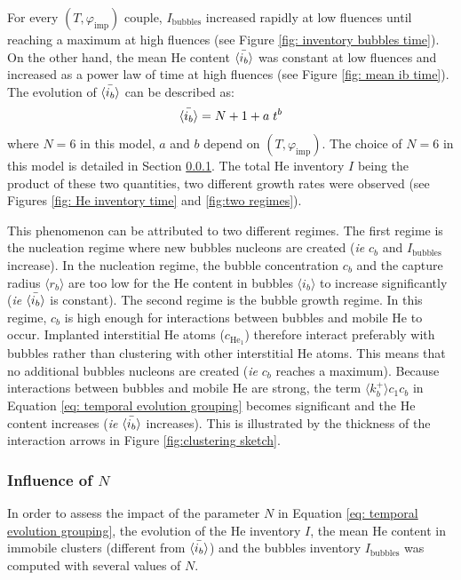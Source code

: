 For every $(T, \varphi_\mathrm{imp})$ couple, $I_\mathrm{bubbles}$ increased rapidly at low fluences until reaching a maximum at high fluences (see Figure \ref{fig: inventory bubbles time}).
On the other hand, the mean He content $\Bar{\langle i_b \rangle}$ was constant at low fluences and increased as a power law of time at high fluences (see Figure \ref{fig: mean ib time}).
The evolution of $\Bar{\langle i_b \rangle}$ can be described as:
\begin{equation}
    \Bar{\langle i_b \rangle} = N + 1 + a \; t^b
    \label{eq: ib evolution}
\end{equation}
where $N=6$ in this model, $a$ and $b$ depend on $(T, \varphi_\mathrm{imp})$.
The choice of $N=6$ in this model is detailed in Section \ref{impact of N}.
The total He inventory $I$ being the product of these two quantities, two different growth rates were observed (see Figures \ref{fig: He inventory time} and \ref{fig:two regimes}).

This phenomenon can be attributed to two different regimes.
The first regime is the nucleation regime where new bubbles nucleons are created (\textit{ie} $c_b$ and $I_\mathrm{bubbles}$ increase).
In the nucleation regime, the bubble concentration $c_b$ and the capture radius $\langle r_b \rangle$ are too low for the He content in bubbles $\langle i_b \rangle$ to increase significantly (\textit{ie} $\Bar{\langle i_b \rangle}$ is constant).
The second regime is the bubble growth regime.
In this regime, $c_b$ is high enough for interactions between bubbles and mobile He to occur.
Implanted interstitial He atoms ($c_{\mathrm{He}_1}$) therefore interact preferably with bubbles rather than clustering with other interstitial He atoms.
This means that no additional bubbles nucleons are created (\textit{ie} $c_b$ reaches a maximum).
Because interactions between bubbles and mobile He are strong, the term $\langle k_b^+ \rangle c_1 c_b$ in Equation \ref{eq: temporal evolution grouping} becomes significant and the He content increases (\textit{ie} $\Bar{\langle i_b \rangle}$ increases).
This is illustrated by the thickness of the interaction arrows in Figure \ref{fig:clustering sketch}.


\subsubsection{Influence of $N$} \label{impact of N}
In order to assess the impact of the parameter $N$ in Equation \ref{eq: temporal evolution grouping}, the evolution of the He inventory $I$, the mean He content in immobile clusters (different from $\Bar{\langle i_b \rangle}$) and the bubbles inventory $I_\mathrm{bubbles}$ was computed with several values of $N$.

